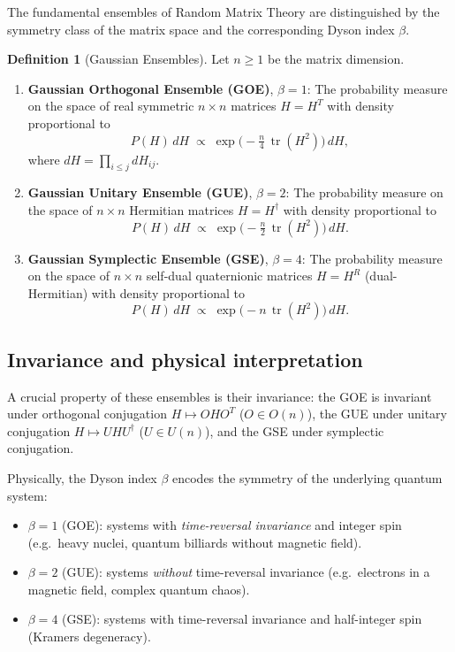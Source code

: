 \documentclass[12pt,a4paper]{amsart}
\theoremstyle{definition}
\newtheorem{definition}[theorem]{Definition}
\theoremstyle{remark}
\begin{document}
The fundamental ensembles of Random Matrix Theory are distinguished by the
symmetry class of the matrix space and the corresponding Dyson index $\beta$.

\begin{definition}[Gaussian Ensembles]
Let $n \geq 1$ be the matrix dimension.
\begin{enumerate}[label=(\roman*)]
  \item \textbf{Gaussian Orthogonal Ensemble (GOE)}, $\beta = 1$:
    The probability measure on the space of real symmetric $n \times n$
    matrices $H = H^T$ with density proportional to
    \[
      P(H)\,dH \;\propto\; \exp\!\bigl(-\tfrac{n}{4}\,\operatorname{tr}(H^2)\bigr)\,dH,
    \]
    where $dH = \prod_{i \leq j} dH_{ij}$.

  \item \textbf{Gaussian Unitary Ensemble (GUE)}, $\beta = 2$:
    The probability measure on the space of $n \times n$ Hermitian matrices
    $H = H^\dagger$ with density proportional to
    \[
      P(H)\,dH \;\propto\; \exp\!\bigl(-\tfrac{n}{2}\,\operatorname{tr}(H^2)\bigr)\,dH.
    \]

  \item \textbf{Gaussian Symplectic Ensemble (GSE)}, $\beta = 4$:
    The probability measure on the space of $n \times n$ self-dual quaternionic
    matrices $H = H^R$ (dual-Hermitian) with density proportional to
    \[
      P(H)\,dH \;\propto\; \exp\!\bigl(-n\,\operatorname{tr}(H^2)\bigr)\,dH.
    \]
\end{enumerate}
\end{definition}

\subsection{Invariance and physical interpretation}

A crucial property of these ensembles is their invariance:
the GOE is invariant under orthogonal conjugation $H \mapsto O H O^T$
($O \in O(n)$), the GUE under unitary conjugation $H \mapsto U H U^\dagger$
($U \in U(n)$), and the GSE under symplectic conjugation.

Physically, the Dyson index $\beta$ encodes the symmetry of the underlying
quantum system:
\begin{itemize}
  \item $\beta = 1$ (GOE): systems with \emph{time-reversal invariance} and
    integer spin (e.g.\ heavy nuclei, quantum billiards without magnetic field).
  \item $\beta = 2$ (GUE): systems \emph{without} time-reversal invariance
    (e.g.\ electrons in a magnetic field, complex quantum chaos).
  \item $\beta = 4$ (GSE): systems with time-reversal invariance and
    half-integer spin (Kramers degeneracy).
\end{itemize}
\end{document}
